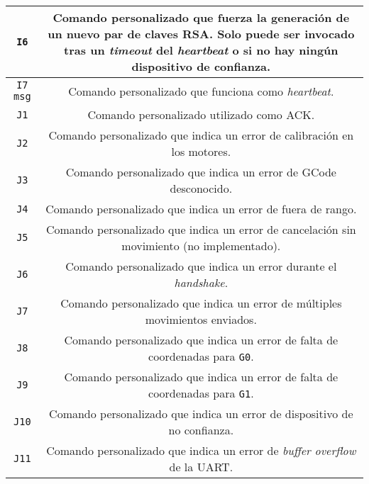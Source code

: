 \begin{longtable}{| C{0.5} | C{1} |}
    \hline
    \texttt{I6} & Comando personalizado que fuerza la generación de un nuevo par de claves RSA. Solo puede ser invocado tras un \textit{timeout} del \textit{heartbeat} o si no hay ningún dispositivo de confianza. \\
    \hline
    \texttt{I7 msg} & Comando personalizado que funciona como \textit{heartbeat}. \\
    \hline
    \texttt{J1} & Comando personalizado utilizado como ACK. \\
    \hline
    \texttt{J2} & Comando personalizado que indica un error de calibración en los motores. \\
    \hline
    \texttt{J3} & Comando personalizado que indica un error de GCode desconocido. \\
    \hline
    \texttt{J4} & Comando personalizado que indica un error de fuera de rango. \\
    \hline
    \texttt{J5} & Comando personalizado que indica un error de cancelación sin movimiento (no implementado). \\
    \hline
    \texttt{J6} & Comando personalizado que indica un error durante el \textit{handshake}. \\
    \hline
    \texttt{J7} & Comando personalizado que indica un error de múltiples movimientos enviados. \\
    \hline
    \texttt{J8} & Comando personalizado que indica un error de falta de coordenadas para \texttt{G0}. \\
    \hline
    \texttt{J9} & Comando personalizado que indica un error de falta de coordenadas para \texttt{G1}. \\
    \hline
    \texttt{J10} & Comando personalizado que indica un error de dispositivo de no confianza. \\
    \hline
    \texttt{J11} & Comando personalizado que indica un error de \textit{buffer overflow} de la \ac{UART}. \\
    \hline
\end{longtable}